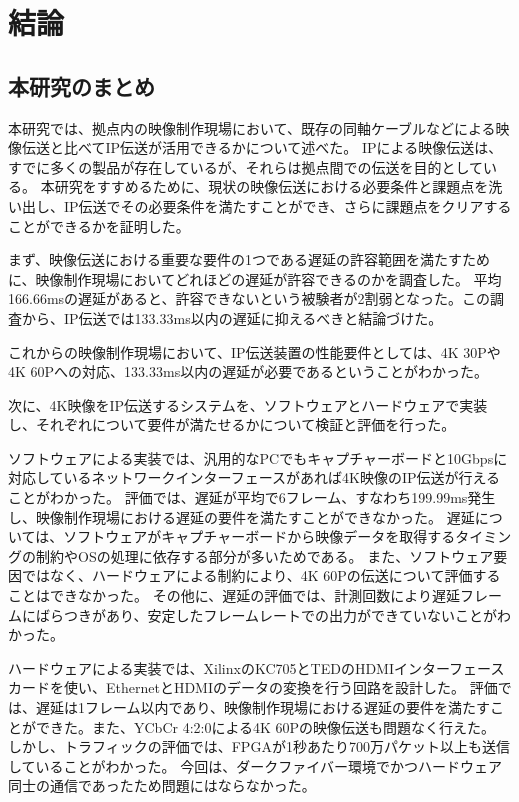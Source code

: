 \chapter{結論}
\label{chap:conclusion}

\section{本研究のまとめ}

本研究では、拠点内の映像制作現場において、既存の同軸ケーブルなどによる映像伝送と比べてIP伝送が活用できるかについて述べた。
IPによる映像伝送は、すでに多くの製品が存在しているが、それらは拠点間での伝送を目的としている。
本研究をすすめるために、現状の映像伝送における必要条件と課題点を洗い出し、IP伝送でその必要条件を満たすことができ、さらに課題点をクリアすることができるかを証明した。

まず、映像伝送における重要な要件の1つである遅延の許容範囲を満たすために、映像制作現場においてどれほどの遅延が許容できるのかを調査した。
平均166.66msの遅延があると、許容できないという被験者が2割弱となった。この調査から、IP伝送では133.33ms以内の遅延に抑えるべきと結論づけた。

これからの映像制作現場において、IP伝送装置の性能要件としては、4K 30Pや4K 60Pへの対応、133.33ms以内の遅延が必要であるということがわかった。

次に、4K映像をIP伝送するシステムを、ソフトウェアとハードウェアで実装し、それぞれについて要件が満たせるかについて検証と評価を行った。

ソフトウェアによる実装では、汎用的なPCでもキャプチャーボードと10Gbpsに対応しているネットワークインターフェースがあれば4K映像のIP伝送が行えることがわかった。
評価では、遅延が平均で6フレーム、すなわち199.99ms発生し、映像制作現場における遅延の要件を満たすことができなかった。
遅延については、ソフトウェアがキャプチャーボードから映像データを取得するタイミングの制約やOSの処理に依存する部分が多いためである。
また、ソフトウェア要因ではなく、ハードウェアによる制約により、4K 60Pの伝送について評価することはできなかった。
その他に、遅延の評価では、計測回数により遅延フレームにばらつきがあり、安定したフレームレートでの出力ができていないことがわかった。

ハードウェアによる実装では、XilinxのKC705とTEDのHDMIインターフェースカードを使い、EthernetとHDMIのデータの変換を行う回路を設計した。
評価では、遅延は1フレーム以内であり、映像制作現場における遅延の要件を満たすことができた。また、YCbCr 4:2:0による4K 60Pの映像伝送も問題なく行えた。
しかし、トラフィックの評価では、FPGAが1秒あたり700万パケット以上も送信していることがわかった。
今回は、ダークファイバー環境でかつハードウェア同士の通信であったため問題にはならなかった。

